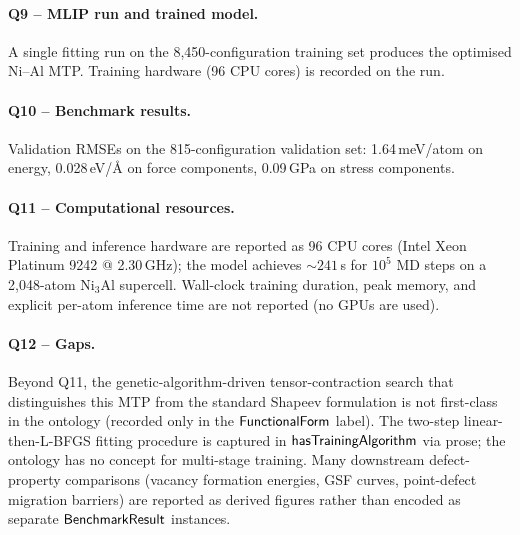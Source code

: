 \paragraph{Q9 -- MLIP run and trained model.}
A single fitting run on the 8{,}450-configuration training set
produces the optimised Ni--Al MTP. Training hardware (96 CPU cores)
is recorded on the run.


\paragraph{Q10 -- Benchmark results.}
Validation RMSEs on the 815-configuration validation set:
1.64\,meV/atom on energy, 0.028\,eV/\AA{} on force components,
0.09\,GPa on stress components.


\paragraph{Q11 -- Computational resources.}
Training and inference hardware are reported as 96 CPU cores (Intel
Xeon Platinum 9242 @ 2.30\,GHz); the model achieves
${\sim}241$\,s for $10^5$ MD steps on a 2{,}048-atom Ni$_3$Al
supercell. Wall-clock training duration, peak memory, and explicit
per-atom inference time are not reported (no GPUs are used).


\paragraph{Q12 -- Gaps.}
Beyond Q11, the genetic-algorithm-driven tensor-contraction search
that distinguishes this MTP from the standard Shapeev formulation is
not first-class in the ontology (recorded only in the
$\mathsf{FunctionalForm}$ label). The two-step linear-then-L-BFGS
fitting procedure is captured in $\mathsf{hasTrainingAlgorithm}$ via
prose; the ontology has no concept for multi-stage training. Many
downstream defect-property comparisons (vacancy formation energies,
GSF curves, point-defect migration barriers) are reported as derived
figures rather than encoded as separate $\mathsf{BenchmarkResult}$ instances.
